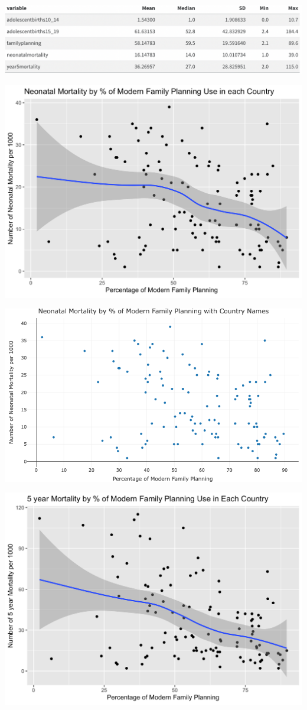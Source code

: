 \documentclass[
  letterpaper,
  DIV=11,
  numbers=noendperiod]{scrartcl}
\begin{document}
\includegraphics{Screen Shot 2023-12-07 at 6.45.03 PM.png}

\includegraphics{neonatal.png}

\includegraphics{newplot (2).png}

\includegraphics{5yeaer.png}
\end{document}
